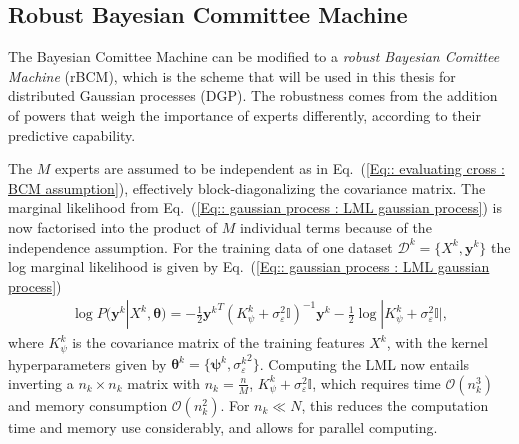 \documentclass[twoside,english]{uiofysmaster}
\begin{document}
{{\subsection{Robust Bayesian Committee Machine}

The Bayesian Comittee Machine can be modified to a \textit{robust Bayesian Comittee Machine} (rBCM), which is the scheme that will be used in this thesis for distributed Gaussian processes (DGP). The robustness comes from the addition of powers that weigh the importance of experts differently, according to their predictive capability. 

The $M$ experts are assumed to be independent \cite{deisenroth2015distributed} as in Eq.~(\ref{Eq:: evaluating cross : BCM assumption}), effectively block-diagonalizing the covariance matrix. The marginal likelihood from Eq.~(\ref{Eq:: gaussian process : LML gaussian process}) is now factorised into the product of $M$ individual terms because of the independence assumption. For the training data of one dataset $\mathcal{D}^k = \{X^k, \textbf{y}^k \}$ the log marginal likelihood is given by Eq.~(\ref{Eq:: gaussian process : LML gaussian process})
\begin{align}
\log P(\textbf{y}^k|X^k, \boldsymbol{\theta}) = - \frac{1}{2} {\textbf{y}^k}^T (K_{\psi}^k + \sigma_{\varepsilon}^2 \mathbb{I})^{-1}\textbf{y}^k - \frac{1}{2} \log
 |K_{\psi}^k + \sigma_{\varepsilon}^2 \mathbb{I} |,
\end{align}
where $K_{\psi}^k$ is the covariance matrix of the training features $X^k$, with the kernel hyperparameters given by $\boldsymbol{\theta}^k = \{ \boldsymbol{\psi}^k, {\sigma_{\varepsilon}^k}^2 \}$. Computing the LML now entails inverting a $n_k \times n_k$ matrix with $n_k = \frac{n}{M}$, $K_{\psi}^{k} + \sigma_{\varepsilon}^2 \mathbb{I}$, which requires time $\mathcal{O}(n_k^3)$ and memory consumption $\mathcal{O}(n_k^2)$. For $n_k \ll N$, this reduces the computation time and memory use considerably, and allows for parallel computing. 

}}
\end{document}
